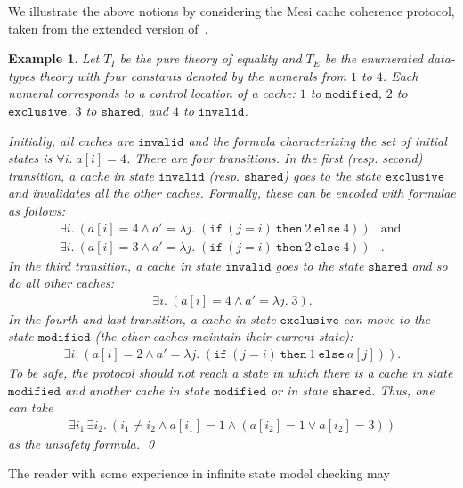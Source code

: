 \documentclass{LMCS}
\theoremstyle{plain}\newtheorem{assumption}[thm]{Assumption}
\theoremstyle{plain}\newtheorem{proposition}[thm]{Proposition}
\theoremstyle{plain}\newtheorem{property}[thm]{Property}
\theoremstyle{plain}\newtheorem{example}[thm]{Example}
\theoremstyle{plain}\newtheorem{claim}[thm]{Claim}
\theoremstyle{plain}\newtheorem{lemma}[thm]{Lemma}
\begin{document}
We illustrate the above notions by considering the Mesi cache
coherence protocol, taken from the extended version of~\cite{tacas06}.
\begin{example}\em
  \label{ex:one}
  Let $T_I$ be the pure theory of equality and $T_E$ be the enumerated
data-types theory with four constants denoted by the numerals from
  $1$ to $4$.  Each numeral corresponds to a control location of a
  cache: $1$ to $\mathtt{modified}$, $2$ to $\mathtt{exclusive}$, $3$
  to $\mathtt{shared}$, and $4$ to $\mathtt{invalid}$.


  Initially, all caches are $\mathtt{invalid}$ and the formula
  characterizing the set of initial states is $\forall i.\; a[i]=4$.
  There are four transitions.  In the first (resp. second) transition,
  a cache in state $\mathtt{invalid}$ (resp. $\mathtt{shared}$) goes
  to the state $\mathtt{exclusive}$ and invalidates all the other
  caches. Formally, these can be encoded with formulae as follows:
\begin{eqnarray*}
    \exists i.~ (a[i]= 4 \wedge
a'=\lambda j.\; (\mathtt{if}~(j=i) ~\mathtt{then}~2~\mathtt{else}~4)) & \mbox{and } \\
    \exists i.~ (a[i]= 3 \wedge
a'=\lambda j.\; (\mathtt{if}~(j=i) ~\mathtt{then}~2~\mathtt{else}~4)) & .
  \end{eqnarray*}
  In the third transition, a cache in state $\mathtt{invalid}$ goes to
  the state $\mathtt{shared}$ and so do all other caches:
  \begin{eqnarray*}
    \exists i.~ (a[i]= 4 \wedge
a'=\lambda j.\; 3) .
  \end{eqnarray*}
  In the fourth and last transition, a cache in state
  $\mathtt{exclusive}$ can move to the state $\mathtt{modified}$ (the
  other caches maintain their current state):
  \begin{eqnarray*}
    \exists i.~ (a[i]= 2 \wedge
a'=\lambda j.\; (\mathtt{if}~(j=i) ~\mathtt{then}~1~\mathtt{else}~a[j])) .
  \end{eqnarray*}
  To be safe, the protocol should not reach a state in which there is
  a cache in state $\mathtt{modified}$ and another cache in state
  $\mathtt{modified}$ or in state $\mathtt{shared}$.  Thus, one can
  take
  \begin{eqnarray*}
    \exists i_1\, \exists i_2.~(i_1\neq i_2 \wedge a[i_1]= 1 \wedge ( a[i_2] = 1 \vee a[i_2]= 3))
  \end{eqnarray*}
  as the unsafety formula. \qed
\end{example}
The reader with some experience in infinite state model checking may
\end{document}
